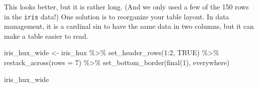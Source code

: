 \documentclass[
]{article}
\newenvironment{Shaded}{\begin{snugshade}}{\end{snugshade}}
\newcommand{\AttributeTok}[1]{\textcolor[rgb]{0.77,0.63,0.00}{#1}}
\newcommand{\ConstantTok}[1]{\textcolor[rgb]{0.00,0.00,0.00}{#1}}
\newcommand{\DecValTok}[1]{\textcolor[rgb]{0.00,0.00,0.81}{#1}}
\newcommand{\FunctionTok}[1]{\textcolor[rgb]{0.00,0.00,0.00}{#1}}
\newcommand{\NormalTok}[1]{#1}
\newcommand{\OtherTok}[1]{\textcolor[rgb]{0.56,0.35,0.01}{#1}}
\newcommand{\SpecialCharTok}[1]{\textcolor[rgb]{0.00,0.00,0.00}{#1}}
\begin{document}
This looks better, but it is rather long. (And we only used a few of the
150 rows in the \texttt{iris} data!) One solution is to reorganize your
table layout. In data management, it is a cardinal sin to have the same
data in two columns, but it can make a table easier to read.

\begin{Shaded}
\begin{Highlighting}[]
\NormalTok{iris\_hux\_wide }\OtherTok{\textless{}{-}}\NormalTok{ iris\_hux }\SpecialCharTok{\%\textgreater{}\%} 
      \FunctionTok{set\_header\_rows}\NormalTok{(}\DecValTok{1}\SpecialCharTok{:}\DecValTok{2}\NormalTok{, }\ConstantTok{TRUE}\NormalTok{) }\SpecialCharTok{\%\textgreater{}\%} 
      \FunctionTok{restack\_across}\NormalTok{(}\AttributeTok{rows =} \DecValTok{7}\NormalTok{) }\SpecialCharTok{\%\textgreater{}\%} 
      \FunctionTok{set\_bottom\_border}\NormalTok{(}\FunctionTok{final}\NormalTok{(}\DecValTok{1}\NormalTok{), everywhere)}

\NormalTok{iris\_hux\_wide}
\end{Highlighting}
\end{Shaded}

 
  \providecommand{\huxb}[2]{\arrayrulecolor[RGB]{#1}\global\arrayrulewidth=#2pt}
  \providecommand{\huxvb}[2]{\color[RGB]{#1}\vrule width #2pt}
  \providecommand{\huxtpad}[1]{\rule{0pt}{#1}}
  \providecommand{\huxbpad}[1]{\rule[-#1]{0pt}{#1}}
\end{document}
